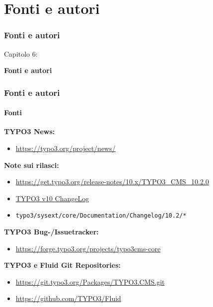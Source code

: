 %

\section{Fonti e autori}
\begin{frame}[fragile]
	\frametitle{Fonti e autori}

	\begin{center}\huge{Capitolo 6:}\end{center}
	\begin{center}\huge{\color{typo3darkgrey}\textbf{Fonti e autori}}\end{center}

\end{frame}


\begin{frame}[fragile]
	\frametitle{Fonti e autori}
	\framesubtitle{Fonti}

	\textbf{TYPO3 News:}
		\begin{itemize}\smaller
			\item \url{https://typo3.org/project/news/}
		\end{itemize}

	\textbf{Note sui rilasci:}
		\begin{itemize}\smaller
			\item \url{https://get.typo3.org/release-notes/10.x/TYPO3_CMS_10.2.0}
			\item \href{https://docs.typo3.org/c/typo3/cms-core/master/en-us/Changelog-10.html}{TYPO3 v10 ChangeLog}
			\item \texttt{typo3/sysext/core/Documentation/Changelog/10.2/*}
		\end{itemize}

	\textbf{TYPO3 Bug-/Issuetracker:}
		\begin{itemize}\smaller
			\item \url{https://forge.typo3.org/projects/typo3cms-core}
		\end{itemize}

	\textbf{TYPO3 e Fluid Git Repositories:}
		\begin{itemize}\smaller
			\item \url{https://git.typo3.org/Packages/TYPO3.CMS.git}
			\item \url{https://github.com/TYPO3/Fluid}
		\end{itemize}

\end{frame}

